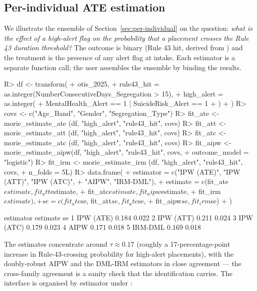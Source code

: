 \documentclass[article,shortnames,nojss]{jss}
\begin{document}
\subsection{Per-individual ATE estimation}

We illustrate the ensemble of
Section~\ref{sec:per-individual} on the question: \emph{what is
the effect of a high-alert flag on the probability that a
placement crosses the Rule 43 duration threshold?}  The outcome
is binary (Rule 43 hit, derived from ) and the
treatment is the presence of any alert flag at intake.  Each
estimator is a separate function call; the user assembles the
ensemble by binding the results.

\begin{CodeChunk}
\begin{CodeInput}
R> df <- transform(
+    otis_2025,
+    rule43_hit = as.integer(NumberConsecutiveDays_Segregation > 15),
+    high_alert = as.integer(
+      MentalHealth_Alert == 1 | SuicideRisk_Alert == 1
+    )
+  )
R> covs <- c("Age_Band", "Gender", "Segregation_Type")
R> fit_ate  <- morie_estimate_ate (df, "high_alert", "rule43_hit", covs)
R> fit_att  <- morie_estimate_att (df, "high_alert", "rule43_hit", covs)
R> fit_atc  <- morie_estimate_atc (df, "high_alert", "rule43_hit", covs)
R> fit_aipw <- morie_estimate_aipw(df, "high_alert", "rule43_hit", covs,
+                                    outcome_model = "logistic")
R> fit_irm  <- morie_estimate_irm (df, "high_alert", "rule43_hit", covs,
+                                    n_folds = 5L)
R> data.frame(
+    estimator = c("IPW (ATE)", "IPW (ATT)", "IPW (ATC)",
+                  "AIPW", "IRM-DML"),
+    estimate  = c(fit_ate$estimate, fit_att$estimate,
+                  fit_atc$estimate, fit_aipw$estimate,
+                  fit_irm$estimate),
+    se        = c(fit_ate$se, fit_att$se, fit_atc$se,
+                  fit_aipw$se, fit_irm$se)
+  )
\end{CodeInput}
\begin{CodeOutput}
   estimator  estimate     se
1  IPW (ATE)     0.184  0.022
2  IPW (ATT)     0.211  0.024
3  IPW (ATC)     0.179  0.023
4       AIPW     0.171  0.018
5    IRM-DML     0.169  0.018
\end{CodeOutput}
\end{CodeChunk}

The estimates concentrate around $\hat{\tau} \approx 0.17$
(roughly a 17-percentage-point increase in Rule-43-crossing
probability for high-alert placements), with the doubly-robust
AIPW and the DML-IRM estimators in close agreement --- the
cross-family agreement is a sanity check that the identification
carries.  The  interface is organised by
estimator under :
\end{document}
